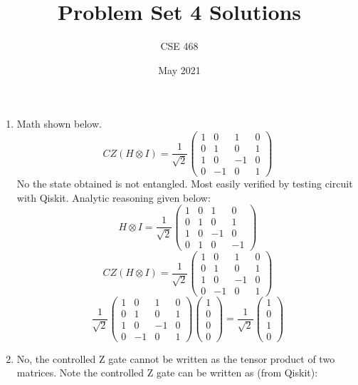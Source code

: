 \documentclass[12pt]{article}
\title{Problem Set 4 Solutions}
\author{CSE 468}
\date{May 2021}
\begin{document}
\maketitle

\begin{enumerate}[font=\bfseries]
    \item Math shown below.
    \[CZ(H \otimes I) = \frac{1}{\sqrt{2}}
    \begin{pmatrix}
    1 & 0 & 1 & 0 \\
    0 & 1 & 0 & 1 \\
    1 & 0 & -1 & 0 \\
    0 & -1 & 0 & 1
    \end{pmatrix}
    \]
    No the state obtained is not entangled. Most easily verified by testing circuit with Qiskit. Analytic reasoning given below:
    \[H \otimes I = \frac{1}{\sqrt{2}}\begin{pmatrix}
    1 & 0 & 1 & 0 \\
    0 & 1 & 0 & 1 \\
    1 & 0 & -1 & 0 \\
    0 & 1 & 0 & -1
    \end{pmatrix}\]
    \[CZ(H \otimes I) = \frac{1}{\sqrt{2}}
    \begin{pmatrix}
    1 & 0 & 1 & 0 \\
    0 & 1 & 0 & 1 \\
    1 & 0 & -1 & 0 \\
    0 & -1 & 0 & 1
    \end{pmatrix}
    \]
    \[\frac{1}{\sqrt{2}}
    \begin{pmatrix}
    1 & 0 & 1 & 0 \\
    0 & 1 & 0 & 1 \\
    1 & 0 & -1 & 0 \\
    0 & -1 & 0 & 1
    \end{pmatrix}
    \begin{pmatrix}
    1 \\ 0 \\ 0 \\ 0
    \end{pmatrix}
    =
    \frac{1}{\sqrt{2}}
    \begin{pmatrix}
    1 \\ 0 \\ 1 \\ 0
    \end{pmatrix}
    \]
    \item No, the controlled Z gate cannot be written as the tensor product of two matrices. Note the controlled Z gate can be written as (from Qiskit):

\end{enumerate}
\end{document}
